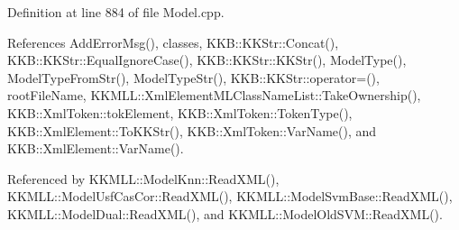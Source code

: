 Definition at line 884 of file Model.\+cpp.



References Add\+Error\+Msg(), classes, K\+K\+B\+::\+K\+K\+Str\+::\+Concat(), K\+K\+B\+::\+K\+K\+Str\+::\+Equal\+Ignore\+Case(), K\+K\+B\+::\+K\+K\+Str\+::\+K\+K\+Str(), Model\+Type(), Model\+Type\+From\+Str(), Model\+Type\+Str(), K\+K\+B\+::\+K\+K\+Str\+::operator=(), root\+File\+Name, K\+K\+M\+L\+L\+::\+Xml\+Element\+M\+L\+Class\+Name\+List\+::\+Take\+Ownership(), K\+K\+B\+::\+Xml\+Token\+::tok\+Element, K\+K\+B\+::\+Xml\+Token\+::\+Token\+Type(), K\+K\+B\+::\+Xml\+Element\+::\+To\+K\+K\+Str(), K\+K\+B\+::\+Xml\+Token\+::\+Var\+Name(), and K\+K\+B\+::\+Xml\+Element\+::\+Var\+Name().



Referenced by K\+K\+M\+L\+L\+::\+Model\+Knn\+::\+Read\+X\+M\+L(), K\+K\+M\+L\+L\+::\+Model\+Usf\+Cas\+Cor\+::\+Read\+X\+M\+L(), K\+K\+M\+L\+L\+::\+Model\+Svm\+Base\+::\+Read\+X\+M\+L(), K\+K\+M\+L\+L\+::\+Model\+Dual\+::\+Read\+X\+M\+L(), and K\+K\+M\+L\+L\+::\+Model\+Old\+S\+V\+M\+::\+Read\+X\+M\+L().


